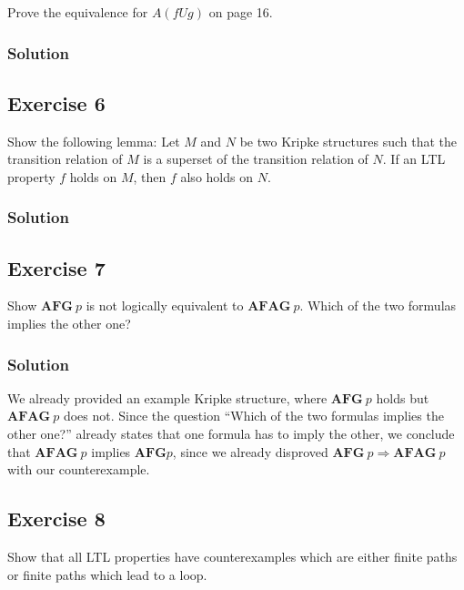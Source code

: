 \documentclass[a4paper, 11pt]{article}
\begin{document}
Prove the equivalence for $A(f U g)$ on page 16.

\subsubsection{Solution}



\subsection{Exercise 6}

Show the following lemma: Let $M$ and $N$ be two Kripke structures such that the transition relation of $M$ is a superset of the transition relation of $N$. If an LTL property $f$ holds on $M$, then $f$ also holds on $N$.

\subsubsection{Solution}



\subsection{Exercise 7}

Show $\mathbf{AFG}~p$ is not logically equivalent to $\mathbf{AFAG}~p$. Which of the two formulas implies the other one?

\subsubsection{Solution}



We already provided an example Kripke structure, where $\mathbf{AFG}~p$ holds but $\mathbf{AFAG}~p$ does not. Since the question “Which of the two formulas implies the other one?” already states that one formula has to imply the other, we conclude that $\mathbf{AFAG}~p$ implies $\mathbf{AFG} p$, since we already disproved $\mathbf{AFG}~p ⇒ \mathbf{AFAG}~p$ with our counterexample.
\subsection{Exercise 8}

Show that all LTL properties have counterexamples which are either finite paths or finite paths which lead to a loop.
\end{document}
